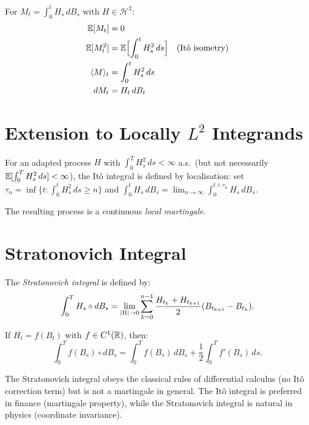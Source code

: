 \begin{keyformulas}[title=\textbf{Key Properties of the It\^o Integral}]
For $M_t = \int_0^t H_s \, dB_s$ with $H \in \mathcal{H}^2$:
\begin{align*}
  \mathbb{E}[M_t] &= 0 \\
  \mathbb{E}[M_t^2] &= \mathbb{E}\Bigl[\int_0^t H_s^2 \, ds\Bigr]
    \quad \text{(It\^o isometry)} \\
  \langle M \rangle_t &= \int_0^t H_s^2 \, ds \\
  dM_t &= H_t \, dB_t
\end{align*}
\end{keyformulas}

\section{Extension to Locally $L^2$ Integrands}

\begin{definition}
For an adapted process $H$ with $\int_0^T H_s^2 \, ds < \infty$ a.s.\ (but not
necessarily $\mathbb{E}[\int_0^T H_s^2 \, ds] < \infty$), the It\^o integral is defined by
localisation: set $\tau_n = \inf\{t : \int_0^t H_s^2 \, ds \geq n\}$ and
$\int_0^t H_s \, dB_s = \lim_{n \to \infty} \int_0^{t \wedge \tau_n} H_s \, dB_s$.

The resulting process is a continuous \emph{local martingale}.
\end{definition}

\section{Stratonovich Integral}

\begin{definition}
The \emph{Stratonovich integral} is defined by:
\[
  \int_0^T H_s \circ dB_s = \lim_{\left| \Pi \right| \to 0}
  \sum_{k=0}^{n-1} \frac{H_{t_k} + H_{t_{k+1}}}{2} (B_{t_{k+1}} - B_{t_k}).
\]
\end{definition}

\begin{proposition}
If $H_t = f(B_t)$ with $f \in C^1(\mathbb{R})$, then:
\[
  \int_0^T f(B_s) \circ dB_s = \int_0^T f(B_s) \, dB_s
  + \frac{1}{2} \int_0^T f'(B_s) \, ds.
\]
\end{proposition}

\begin{remark}
The Stratonovich integral obeys the classical rules of differential calculus (no
It\^o correction term) but is not a martingale in general. The It\^o integral is
preferred in finance (martingale property), while the Stratonovich integral is
natural in physics (coordinate invariance).
\end{remark}

